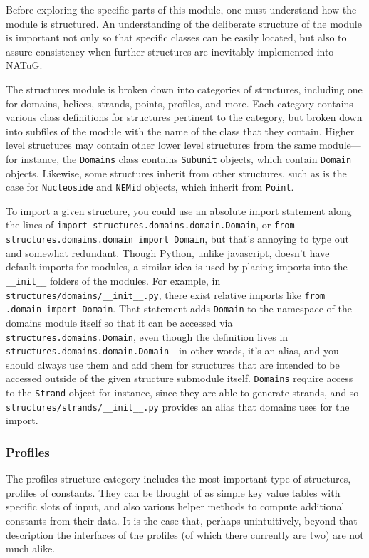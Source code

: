 \documentclass[titlepage]{article}
\begin{document}
	Before exploring the specific parts of this module, one must understand how the module is structured. An understanding of the deliberate structure of the module is important not only so that specific classes can be easily located, but also to assure consistency when further structures are inevitably implemented into NATuG.
	
	The structures module is broken down into categories of structures, including one for domains, helices, strands, points, profiles, and more. Each category contains various class definitions for structures pertinent to the category, but broken down into subfiles of the module with the name of the class that they contain. Higher level structures may contain other lower level structures from the same module---for instance, the \texttt{Domains} class contains \texttt{Subunit} objects, which contain \texttt{Domain} objects. Likewise, some structures inherit from other structures, such as is the case for \texttt{Nucleoside} and \texttt{NEMid} objects, which inherit from \texttt{Point}.
	
	To import a given structure, you could use an absolute import statement along the lines of \texttt{import structures.domains.domain.Domain}, or \texttt{from structures.domains.domain import Domain}, but that's annoying to type out and somewhat redundant. Though Python, unlike javascript, doesn't have default-imports for modules, a similar idea is used by placing imports into the \texttt{\_\_init\_\_} folders of the modules. For example, in \texttt{structures/domains/\_\_init\_\_.py}, there exist relative imports like \texttt{from .domain import Domain}. That statement adds \texttt{Domain} to the namespace of the domains module itself so that it can be accessed via \texttt{structures.domains.Domain}, even though the definition lives in \texttt{structures.domains.domain.Domain}---in other words, it's an alias, and you should always use them and add them for structures that are intended to be accessed outside of the given structure submodule itself. \texttt{Domains} require access to the \texttt{Strand} object for instance, since they are able to generate strands, and so \texttt{structures/strands/\_\_init\_\_.py} provides an alias that domains uses for the import.
	
	\subsubsection{Profiles}
	The profiles structure category includes the most important type of structures, profiles of constants. They can be thought of as simple key value tables with specific slots of input, and also various helper methods to compute additional constants from their data. It is the case that, perhaps unintuitively, beyond that description the interfaces of the profiles (of which there currently are two) are not much alike.
	
\end{document}
